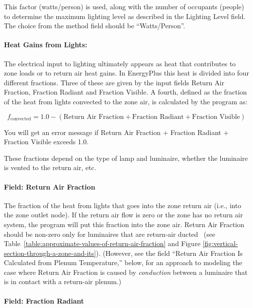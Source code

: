 This factor (watts/person) is used, along with the number of occupants (people) to determine the maximum lighting level as described in the Lighting Level field. The choice from the method field should be ``Watts/Person''.

\paragraph{Heat Gains from Lights:}\label{heat-gains-from-lights-lights-definition}

The electrical input to lighting ultimately appears as heat that contributes to zone loads or to return air heat gains. In EnergyPlus this heat is divided into four different fractions. Three of these are given by the input fields Return Air Fraction, Fraction Radiant and Fraction Visible. A fourth, defined as the fraction of the heat from lights convected to the zone air, is calculated by the program as:

$$ f_{\textrm{convected}} = 1.0 - (\textrm{Return Air Fraction} + \textrm{Fraction Radiant} + \textrm{Fraction Visible}) $$

You will get an error message if Return Air Fraction + Fraction Radiant + Fraction Visible exceeds 1.0.

These fractions depend on the type of lamp and luminaire, whether the luminaire is vented to the return air, etc.

\paragraph{Field: Return Air Fraction}\label{field-return-air-fraction-lights-definition}

The fraction of the heat from lights that goes into the zone return air (i.e., into the zone outlet node). If the return air flow is zero or the zone has no return air system, the program will put this fraction into the zone air. Return Air Fraction should be non-zero only for luminaires that are return-air ducted~ (see Table~\ref{table:approximate-values-of-return-air-fraction} and Figure \ref{fig:vertical-section-through-a-zone-and-its}). (However, see the field ``Return Air Fraction Is Calculated from Plenum Temperature,'' below, for an approach to modeling the case where Return Air Fraction is caused by \emph{conduction} between a luminaire that is in contact with a return-air plenum.)

\paragraph{Field: Fraction Radiant}\label{field-fraction-radiant-1-lights-definition}


